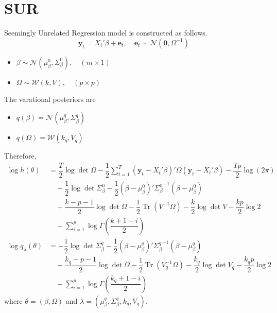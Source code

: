 \documentclass[12pt]{article}
\DeclareMathOperator{\Tr}{Tr}
\begin{document}
\section{SUR}
Seemingly Unrelated Regression model is constructed as follows.
\begin{equation}
  \mathbf{y}_{t} = X_{i}'\beta+\mathbf{e}_{t},\quad \mathbf{e}_{t}\sim\mathcal{N}\left(\mathbf{0},\Omega^{-1}\right)
\end{equation}
\begin{itemize}
\item $\beta\sim\mathcal{N}\left(\mu_{\beta}^{0},\Sigma_{\beta}^{0}\right),\quad (m\times 1)$
\item $\Omega\sim\mathcal{W}(k,V),\quad (p\times p)$
\end{itemize}
The varational posteriors are
\begin{itemize}
  \item $q(\beta) = \mathcal{N}\left(\mu_{\beta}^{q},\Sigma_{\beta}^{q}\right)$
  \item $q(\Omega) = \mathcal{W}\left(k_{q},V_{q}\right)$
\end{itemize}
Therefore,
\begin{align}
  \log h(\theta) &= \dfrac{T}{2}\log\det\Omega-\dfrac{1}{2}\sum_{t=1}^{T}\left(\mathbf{y}_{t}-X_{t}'\beta\right)'\Omega\left(\mathbf{y}_{t}-X_{t}'\beta\right)-\dfrac{Tp}{2}\log(2\pi)\\
  &\quad -\dfrac{1}{2}\log\det\Sigma_{\beta}^{0}-\dfrac{1}{2}\left(\beta-\mu_{\beta}^{0}\right)'{\Sigma_{\beta}^{0}}^{-1}\left(\beta-\mu_{\beta}^{0}\right)\\
  &\quad +\dfrac{k-p-1}{2}\log\det\Omega-\dfrac{1}{2}\Tr\left(V^{-1}\Omega\right)-\dfrac{k}{2}\log\det V-\dfrac{kp}{2}\log 2\\
  &\quad -\sum_{i=1}^{p}\log\Gamma\left(\dfrac{k+1-i}{2}\right)\\
  \log q_{\lambda}(\theta) &= -\dfrac{1}{2}\log\det \Sigma_{\beta}^{q}-\dfrac{1}{2}\left(\beta-\mu_{\beta}^{q}\right)'{\Sigma_{\beta}^{q}}^{-1}\left(\beta-\mu_{\beta}^{q}\right)\\
  &\quad + \dfrac{k_{q}-p-1}{2}\log\det\Omega-\dfrac{1}{2}\Tr\left(V_{q}^{-1}\Omega\right)-\dfrac{k_{q}}{2}\log\det V_{q}-\dfrac{k_{q}p}{2}\log 2\\
  &\quad -\sum_{i=1}^{p}\log\Gamma\left(\dfrac{k_{q}+1-i}{2}\right)
\end{align}
where $\theta=(\beta,\Omega)$ and $\lambda=\left(\mu_{\beta}^{q},\Sigma_{\beta}^{q},k_{q},V_{q}\right)$.
\newpage
\nocite{*}


\end{document}
